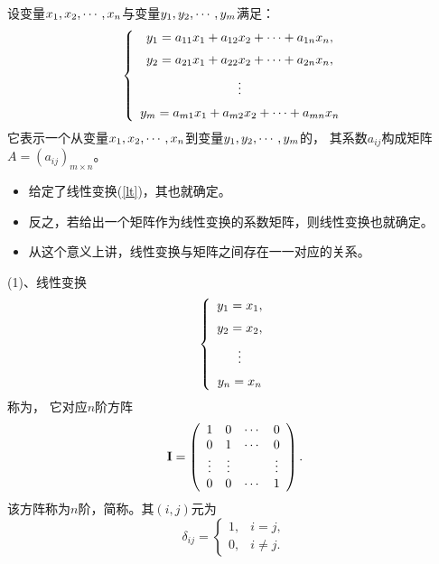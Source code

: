 \begin{li}
  设变量$x_1, x_2, \cdots, x_n$与变量$y_1,y_2,\cdots,y_m$满足：
  \begin{equation}\label{lt}
    \left\{
      \begin{array}{c}
        y_1  = a_{11} x_1 + a_{12} x_2 + \cdots + a_{1n} x_n, \\[0.2cm]
        y_2  = a_{21} x_1 + a_{22} x_2 + \cdots + a_{2n} x_n, \\[0.2cm]
        \vdots \\[0.2cm]
        y_m  = a_{m1} x_1 + a_{m2} x_2 + \cdots + a_{mn} x_n
      \end{array}
    \right.
  \end{equation}
  它表示一个从变量$x_1, x_2, \cdots, x_n$到变量$y_1,y_2,\cdots,y_m$的， 其系数$a_{ij}$构成矩阵$A=(a_{ij})_{m\times n}$。
\end{li}
\begin{itemize}
\item  给定了线性变换(\ref{lt})，其也就确定。 
\item   反之，若给出一个矩阵作为线性变换的系数矩阵，则线性变换也就确定。 
\item   从这个意义上讲，线性变换与矩阵之间存在一一对应的关系。
\end{itemize}      

(1)、线性变换
$$
\left\{
  \begin{array}{c}
    y_1 = x_1, \\[0.2cm]
    y_2 = x_2, \\[0.2cm]
    \vdots \\[0.2cm]
    y_n = x_n
  \end{array}
\right.
$$
称为， 它对应$n$阶方阵
$$
\mathbf{I} = \left(
  \begin{array}{cccc}
    1    & 0    & \cdots  & 0 \\
    0    & 1    & \cdots  & 0 \\
    \vdots  & \vdots  &      & \vdots \\
    0    & 0    & \cdots  & 1
  \end{array}
\right). 
$$ 
该方阵称为$n$阶，简称。其$(i,j)$元为
$$
\delta_{ij} = \left \{
  \begin{array}{ll}
    1, &i=j, \\
    0, &i\ne j.
  \end{array}
\right.  
$$

